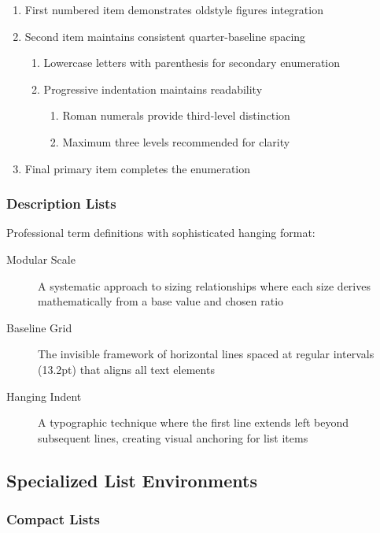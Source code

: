 \documentclass[11pt,letterpaper]{article}
\begin{document}
\begin{enumerate}
\item First numbered item demonstrates oldstyle figures integration
\item Second item maintains consistent quarter-baseline spacing
  \begin{enumerate}
  \item Lowercase letters with parenthesis for secondary enumeration
  \item Progressive indentation maintains readability
    \begin{enumerate}
    \item Roman numerals provide third-level distinction
    \item Maximum three levels recommended for clarity
    \end{enumerate}
  \end{enumerate}
\item Final primary item completes the enumeration
\end{enumerate}

\subsubsection{Description Lists}

Professional term definitions with sophisticated hanging format:

\begin{description}
\item[Modular Scale] A systematic approach to sizing relationships where each size derives mathematically from a base value and chosen ratio
\item[Baseline Grid] The invisible framework of horizontal lines spaced at regular intervals (13.2pt) that aligns all text elements
\item[Hanging Indent] A typographic technique where the first line extends left beyond subsequent lines, creating visual anchoring for list items
\end{description}

\subsection{Specialized List Environments}

\subsubsection{Compact Lists}
\end{document}
